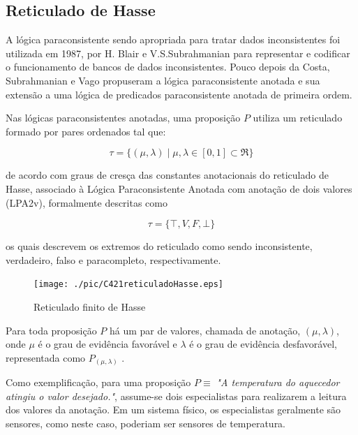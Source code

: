 

\subsection{Reticulado de Hasse}

A lógica paraconsistente sendo apropriada para tratar dados inconsistentes foi utilizada em 1987, por H. Blair e V.S.Subrahmanian para representar e codificar o funcionamento de bancos de dados inconsistentes. Pouco depois da Costa, Subrahmanian e Vago propuseram a lógica paraconsistente anotada e sua extensão a uma lógica de predicados paraconsistente anotada de primeira ordem. 

Nas lógicas paraconsistentes anotadas, uma proposição $P$ utiliza um reticulado formado por pares ordenados tal que: 

\begin{center}
\begin{equation}
\tau = \{ ( \mu , \lambda ) \mid \mu ,\lambda \in [0,1] \subset \Re \}
\end{equation}
\end{center}

de acordo com graus de cresça das constantes anotacionais do reticulado de Hasse, associado à Lógica Paraconsistente Anotada com anotação de dois valores (LPA2v), formalmente descritas como 

\begin{center}
\begin{equation}
  \tau = \{ \top , V, F, \bot \}
\end{equation}
\end{center}

os quais descrevem os extremos do reticulado como sendo inconsistente, verdadeiro, falso e paracompleto, respectivamente. 

\begin{figure}[!htb]
\center\texttt{[image: ./pic/C421reticuladoHasse.eps]}
\caption{Reticulado finito de Hasse}
\label{fig:reticuladoHasse}
\end{figure}

Para toda proposição $P$ há um par de valores, chamada de anotação, $(\mu , \lambda )$, onde $\mu$ é o grau de evidência favorável e $\lambda $ é o grau de evidência desfavorável, representada como  $P_{( \mu , \lambda )}$ .

Como exemplificação, para uma proposição $P \equiv$ \emph{"A temperatura do aquecedor atingiu o valor desejado."}, assume-se dois especialistas para realizarem a leitura dos valores da anotação. Em um sistema físico, os especialistas geralmente são sensores, como neste caso, poderiam ser sensores de temperatura.

